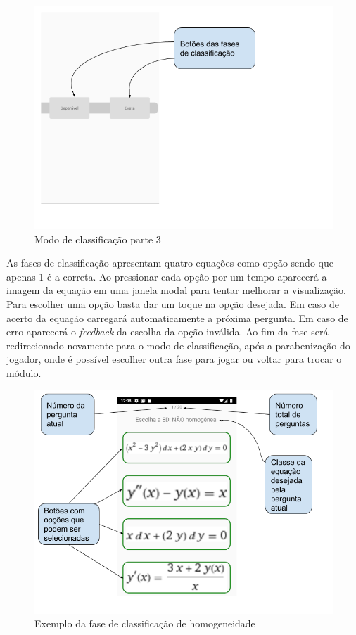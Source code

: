 \begin{figure}[H]
\centering
\caption{Modo de classificação parte 3}
\includegraphics[scale=0.52]{figuras/modo_classificacao_3.png}
\end{figure}

As fases de classificação apresentam quatro equações como opção sendo que apenas 1 é a correta.
Ao pressionar cada opção por um tempo aparecerá a imagem da equação em uma janela modal para tentar melhorar a visualização.
Para escolher uma opção basta dar um toque na opção desejada.
Em caso de acerto da equação carregará automaticamente a próxima pergunta.
Em caso de erro aparecerá o \textit{feedback} da escolha da opção inválida.
Ao fim da fase será redirecionado novamente para o modo de classificação, após a parabenização do jogador, onde é possível escolher outra fase para jogar ou voltar para trocar o módulo.

\begin{figure}[H]
\centering
\caption{Exemplo da fase de classificação de homogeneidade}
\includegraphics[scale=0.52]{figuras/ex_ed_n_homog.png}
\end{figure}

